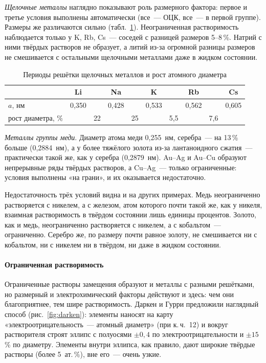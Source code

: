 \emph{Щелочные металлы} наглядно показывают роль размерного фактора:
первое и третье условия выполнены автоматически (все~— ОЦК, все~— в
первой группе). Размеры же различаются сильно (табл.~\ref{tab:alkali}).
Неограниченная растворимость наблюдается только у K, Rb, Cs~— соседей с
разницей размеров 5--8\,\%. Натрий с ними твёрдых растворов не
образует, а литий из-за огромной разницы размеров не смешивается с
остальными щелочными металлами даже в жидком состоянии.

\begin{table}[ht]
\centering
\caption{Периоды решётки щелочных металлов и рост атомного диаметра}
\label{tab:alkali}
\small
\begin{tabular}{@{}lccccccccc@{}}
\toprule
 & Li & & Na & & K & & Rb & & Cs \\
\midrule
$a$, нм & 0,350 & & 0,428 & & 0,533 & & 0,562 & & 0,605 \\
рост диаметра, \% & & 22 & & 25 & & 5,5 & & 7,6 & \\
\bottomrule
\end{tabular}
\end{table}

\emph{Металлы группы меди}. Диаметр атома меди 0,255~нм, серебра~— на
13\,\% больше (0,2884~нм), а у более тяжёлого золота из-за лантаноидного
сжатия~— практически такой же, как у серебра (0,2879~нм). Au--Ag и Au--Cu
образуют непрерывные ряды твёрдых растворов, а Cu--Ag~— только
ограниченные: условия выполнены «на грани», и их оказывается
недостаточно.

Недостаточность трёх условий видна и на других примерах. Медь
неограниченно растворяется с никелем, а с железом, атом которого почти
такой же, как у никеля, взаимная растворимость в твёрдом состоянии лишь
единицы процентов. Золото,
как и медь, неограниченно растворяется с никелем, а с кобальтом~—
ограниченно. Серебро же, по размеру почти равное золоту, не смешивается
ни с кобальтом, ни с никелем ни в твёрдом, ни даже в жидком состоянии.

\paragraph{Ограниченная растворимость}
Ограниченные растворы замещения образуют и металлы с разными решётками,
но размерный и электрохимический факторы действуют и здесь: чем они
благоприятнее, тем шире растворимость. Даркен и Гурри предложили
наглядный способ (рис.~\ref{fig:darken}): элементы наносят на карту
«электроотрицательность~— атомный диаметр» (при к.\,ч.~12) и вокруг
растворителя строят эллипс с полуосями $\pm0{,}4$ по
электроотрицательности и $\pm15$\,\% по диаметру. Элементы внутри
эллипса, как правило, дают широкие твёрдые растворы (более 5~ат.\,\%),
вне его~— очень узкие.


